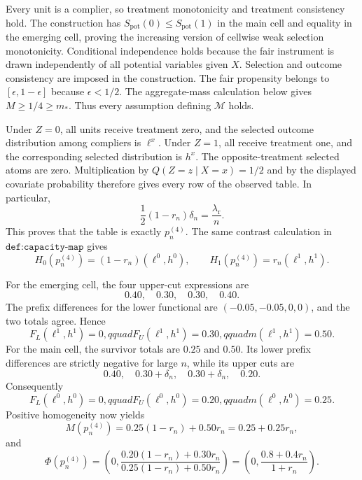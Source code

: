 Every unit is a complier, so treatment monotonicity and treatment consistency hold.  The construction has \(S_{\mathrm{pot}}(0)\le S_{\mathrm{pot}}(1)\) in the main cell and equality in the emerging cell, proving the increasing version of cellwise weak selection monotonicity.  Conditional independence holds because the fair instrument is drawn independently of all potential variables given \(X\).  Selection and outcome consistency are imposed in the construction.  The fair propensity belongs to \([\epsilon,1-\epsilon]\) because \(\epsilon<1/2\).  The aggregate-mass calculation below gives \(M\ge1/4\ge m_*\).  Thus every assumption defining \(\mathcal M\) holds.

Under \(Z=0\), all units receive treatment zero, and the selected outcome distribution among compliers is \(\ell^x\).  Under \(Z=1\), all receive treatment one, and the corresponding selected distribution is \(h^x\).  The opposite-treatment selected atoms are zero.  Multiplication by \(Q(Z=z\mid X=x)=1/2\) and by the displayed covariate probability therefore gives every row of the observed table.  In particular,
\[
\frac12(1-r_n)\delta_n=\frac{\lambda_{\mathrm r}}n.
\]
This proves that the table is exactly \(p_n^{(4)}\).  The same contrast calculation in \(\texttt{def:capacity-map}\) gives
\[
H_0(p_n^{(4)})=(1-r_n)(\ell^0,h^0),
\qquad
H_1(p_n^{(4)})=r_n(\ell^1,h^1).
\]

For the emerging cell, the four upper-cut expressions are
\[
0.40,\quad0.30,\quad0.30,\quad0.40.
\]
The prefix differences for the lower functional are \((-0.05,-0.05,0,0)\), and the two totals agree.  Hence
\[
F_L(\ell^1,h^1)=0,qquad F_U(\ell^1,h^1)=0.30,qquad m(\ell^1,h^1)=0.50.
\]
For the main cell, the survivor totals are \(0.25\) and \(0.50\).  Its lower prefix differences are strictly negative for large \(n\), while its upper cuts are
\[
0.40,\quad0.30+\delta_n,\quad0.30+\delta_n,\quad0.20.
\]
Consequently
\[
F_L(\ell^0,h^0)=0,qquad F_U(\ell^0,h^0)=0.20,qquad m(\ell^0,h^0)=0.25.
\]
Positive homogeneity now yields
\[
M(p_n^{(4)})=0.25(1-r_n)+0.50r_n=0.25+0.25r_n,
\]
and
\[
\Phi(p_n^{(4)})=
\left(0,\frac{0.20(1-r_n)+0.30r_n}{0.25(1-r_n)+0.50r_n}\right)
=\left(0,\frac{0.8+0.4r_n}{1+r_n}\right).
\]

